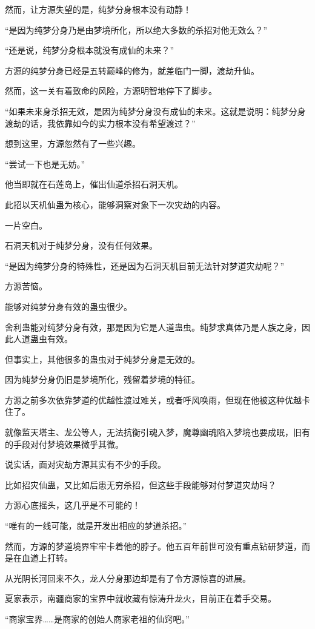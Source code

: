 \begin{this_body}
然而，让方源失望的是，纯梦分身根本没有动静！

“是因为纯梦分身乃是由梦境所化，所以绝大多数的杀招对他无效么？”

“还是说，纯梦分身根本就没有成仙的未来？”

方源的纯梦分身已经是五转巅峰的修为，就差临门一脚，渡劫升仙。

然而，这一关有着致命的风险，方源明智地停下了脚步。

“如果未来身杀招无效，是因为纯梦分身没有成仙的未来。这就是说明：纯梦分身渡劫的话，我依靠如今的实力根本没有希望渡过？”

想到这里，方源忽然有了一些兴趣。

“尝试一下也是无妨。”

他当即就在石莲岛上，催出仙道杀招石洞天机。

此招以天机仙蛊为核心，能够洞察对象下一次灾劫的内容。

一片空白。

石洞天机对于纯梦分身，没有任何效果。

“是因为纯梦分身的特殊性，还是因为石洞天机目前无法针对梦道灾劫呢？”

方源苦恼。

能够对纯梦分身有效的蛊虫很少。

舍利蛊能对纯梦分身有效，那是因为它是人道蛊虫。纯梦求真体乃是人族之身，因此人道蛊虫有效。

但事实上，其他很多的蛊虫对于纯梦分身是无效的。

因为纯梦分身仍旧是梦境所化，残留着梦境的特征。

方源之前多次依靠梦道的优越性渡过难关，或者呼风唤雨，但现在他被这种优越卡住了。

就像监天塔主、龙公等人，无法抗衡引魂入梦，魔尊幽魂陷入梦境也要成眠，旧有的手段对付梦境效果微乎其微。

说实话，面对灾劫方源其实有不少的手段。

比如招灾仙蛊，又比如后患无穷杀招，但这些手段能够对付梦道灾劫吗？

方源心底摇头，这几乎是不可能的！

“唯有的一线可能，就是开发出相应的梦道杀招。”

然而，方源的梦道境界牢牢卡着他的脖子。他五百年前世可没有重点钻研梦道，而是在血道上打转。

从光阴长河回来不久，龙人分身那边却是有了令方源惊喜的进展。

夏家表示，南疆商家的宝界中就收藏有惊涛升龙火，目前正在着手交易。

“商家宝界……是商家的创始人商家老祖的仙窍吧。”


\end{this_body}
